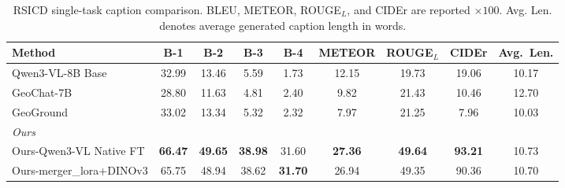 \begin{table}[t]
  \caption{RSICD single-task caption comparison. BLEU, METEOR, ROUGE$_L$, and CIDEr are reported $\times 100$. Avg. Len. denotes average generated caption length in words.}
  \label{tab:RSICD_single_task_caption}
  \vspace{5pt}
  \centering
  \scriptsize
  \setlength{\tabcolsep}{4pt}
  \renewcommand{\arraystretch}{1.08}
  \begin{tabular}{lcccccccc}
    \toprule
    Method & B-1 & B-2 & B-3 & B-4 & METEOR & ROUGE$_L$ & CIDEr & Avg.\ Len. \\
    \midrule
    Qwen3-VL-8B Base                    & 32.99          & 13.46          & 5.59           & 1.73           & 12.15          & 19.73          & 19.06          & 10.17 \\
    GeoChat-7B                         & 28.80          & 11.63          & 4.81           & 2.40           & 9.82           & 21.43          & 10.46          & 12.70 \\
    GeoGround                          & 33.02          & 13.34          & 5.32           & 2.32           & 7.97           & 21.25          & 7.96           & 10.03 \\
    \midrule
    \multicolumn{9}{l}{\textit{Ours}} \\
    Ours-Qwen3-VL Native FT            & \textbf{66.47} & \textbf{49.65} & \textbf{38.98} & 31.60          & \textbf{27.36} & \textbf{49.64} & \textbf{93.21} & 10.73 \\
    Ours-merger\_lora+DINOv3           & 65.75          & 48.94          & 38.62          & \textbf{31.70} & 26.94          & 49.35          & 90.36          & 10.70 \\
    \bottomrule
  \end{tabular}
\end{table}
